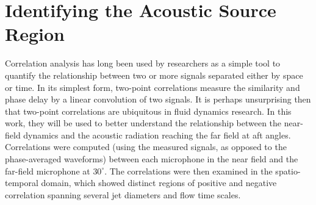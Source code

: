 \section{Identifying the Acoustic Source Region}
Correlation analysis has long been used by researchers as a simple tool to quantify the relationship between two or more signals separated either by space or time.
In its simplest form, two-point correlations measure the similarity and phase delay by a linear convolution of two signals.
It is perhaps unsurprising then that two-point correlations are ubiquitous in fluid dynamics research.
In this work, they will be used to better understand the relationship between the near-field dynamics and the acoustic radiation reaching the far field at aft angles.
Correlations were computed (using the measured signals, as opposed to the phase-averaged waveforms) between each microphone in the near field and the far-field microphone at $30^\circ$. 
The correlations were then examined in the spatio-temporal domain, which showed distinct regions of positive and negative correlation spanning several jet diameters and flow time scales.
